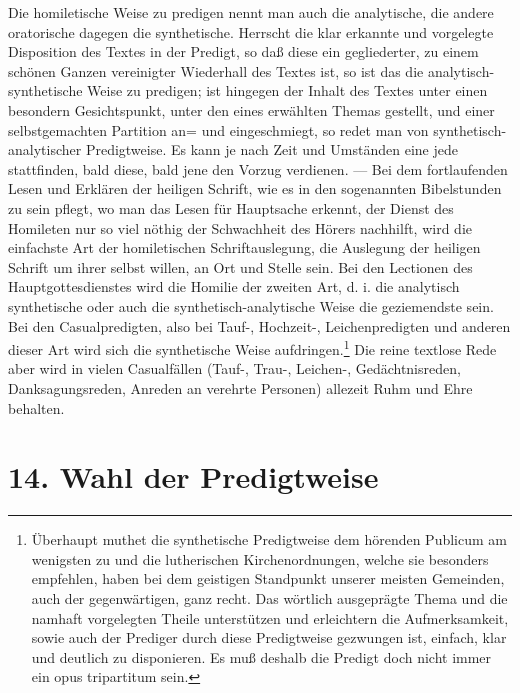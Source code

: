 Die homiletische Weise zu predigen nennt man auch die analytische, die andere oratorische dagegen die synthetische. Herrscht die klar erkannte und vorgelegte Disposition des Textes in der Predigt, so daß diese ein gegliederter, zu einem schönen Ganzen vereinigter Wiederhall des Textes ist, so ist das die analytisch-synthetische Weise zu predigen; ist hingegen der Inhalt des Textes unter einen besondern Gesichtspunkt, unter den eines erwählten Themas gestellt, und einer selbstgemachten Partition an= und eingeschmiegt, so redet man von synthetisch-analytischer Predigtweise. Es kann je nach Zeit und Umständen eine jede stattfinden, bald diese, bald jene den Vorzug verdienen. — Bei dem fortlaufenden Lesen und Erklären der heiligen Schrift, wie es in den sogenannten Bibelstunden zu sein pflegt, wo man das Lesen für Hauptsache erkennt, der Dienst des Homileten nur so viel nöthig der Schwachheit des Hörers nachhilft, wird die einfachste Art der homiletischen Schriftauslegung, die Auslegung der heiligen Schrift um ihrer selbst willen, an Ort und Stelle sein. Bei den Lectionen des Hauptgottesdienstes wird die Homilie der zweiten Art, d. i. die analytisch%
synthetische oder auch die synthetisch-analytische Weise die geziemendste sein. Bei den Casualpredigten, also bei Tauf-, Hochzeit-, Leichenpredigten und anderen dieser Art wird sich die synthetische Weise aufdringen.\footnote{Überhaupt muthet die synthetische Predigtweise dem hörenden Publicum am wenigsten zu und die lutherischen Kirchenordnungen, welche sie besonders empfehlen, haben bei dem geistigen Standpunkt unserer meisten Gemeinden, auch der gegenwärtigen, ganz recht. Das wörtlich ausgeprägte Thema und die namhaft vorgelegten Theile unterstützen und erleichtern die Aufmerksamkeit, sowie auch der Prediger durch diese Predigtweise gezwungen ist, einfach, klar und deutlich zu disponieren. Es muß deshalb die Predigt doch nicht immer ein opus tripartitum sein.} Die reine textlose Rede aber wird in vielen Casualfällen (Tauf-, Trau-, Leichen-, Gedächtnisreden, Danksagungsreden, Anreden an verehrte Personen) allezeit Ruhm und Ehre behalten.

\section{14. Wahl der Predigtweise}

